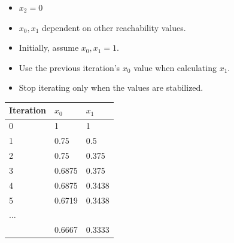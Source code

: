 \documentclass[10pt, landscape]{article}
\begin{document}
\begin{multicols*}{3}
\begin{itemize}
        \item $x_2 = 0$
    \end{itemize}
    \begin{itemize}
        \item $x_0, x_1$ dependent on other reachability values.
        \item Initially, assume $x_0, x_1 = 1$.
        \item Use the previous iteration's $x_0$ value when calculating $x_1$.
        \item Stop iterating only when the values are stabilized.
    \end{itemize}
    \begin{center}
        \begin{scriptsize}
            \begin{tabular}{|l|l|l|}
                \hline
                Iteration & $x_0$ & $x_1$ \\
                \hline
                0 & 1 & 1 \\
                \hline
                1 & 0.75 & 0.5 \\
                \hline
                2 & 0.75 & 0.375 \\
                \hline
                3 & 0.6875 & 0.375 \\
                \hline
                4 & 0.6875 & 0.3438 \\
                \hline
                5 & 0.6719 & 0.3438 \\
                \hline
                $\dots$ &  &  \\
                \hline
                  & 0.6667 & 0.3333 \\
                \hline
            \end{tabular}
        \end{scriptsize}
    \end{center}
\end{multicols*}
\newpage
\end{document}
